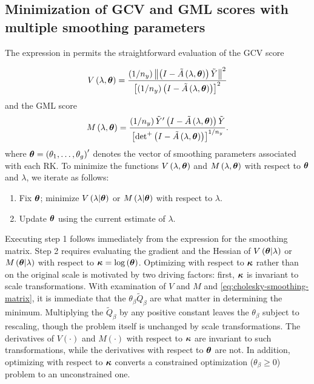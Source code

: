 \documentclass[12pt]{article}
\newcommand{\bftheta}{\mbox{\boldmath $\theta$}}
\newcommand{\bfkappa}{\mbox{\boldmath $\kappa$}}
\newcommand{\tildeY}{\tilde{Y}}
\newcommand{\tildeQ}{\tilde{Q}}
\newcommand{\tildeA}{\tilde{A}}
\theoremstyle{definition}
\begin{document}
\subsection{Minimization of GCV and GML scores with multiple smoothing parameters}

The expression in \label{ref:cholesky-smoothing-matrix} permits the straightforward evaluation of the GCV score

\begin{equation} \label{eq:general-GCV-score}
V\left(\lambda, \bftheta \right) = \frac{\left( 1/n_y \right)  \left \lVert \left(I - \tildeA\left(\lambda, \bftheta \right)\right) \tildeY \right\rVert^2}{\left[\left( 1/n_y \right) \left(I - \tildeA\left(\lambda, \bftheta \right)\right)  \right]^2}
\end{equation}
\noindent
and the GML score
\begin{equation} \label{eq:general-GML-score}
M\left(\lambda, \bftheta \right) = \frac{\left( 1/n_y \right) \tildeY' \left(I - \tildeA\left(\lambda, \bftheta \right)\right) \tildeY }{\left[ \mbox{det}^+\left(I - \tildeA\left(\lambda, \bftheta \right)\right)  \right]^{1/n_y}}.
\end{equation}
\noindent
where $\bftheta = \left(\theta_1,\dots, \theta_g\right)'$ denotes the vector of smoothing parameters associated with each RK.
\bigskip
To minimize the functions $V\left(\lambda, \bftheta\right)$ and $M\left(\lambda, \bftheta\right)$ with respect to $\bftheta$ and $\lambda$, we iterate as follows:

\begin{enumerate}
\item Fix $\bftheta$; minimize $V\left(\lambda \vert \bftheta\right)$ or $M\left(\lambda \vert \bftheta\right)$ with respect to $\lambda$.
\item Update $\bftheta$ using the current estimate of $\lambda$.
\end{enumerate}
\noindent
Executing step 1 follows immediately from the expression for the smoothing matrix. Step 2 requires evaluating the gradient and the Hessian of $V\left( \bftheta \vert \lambda \right)$ or $M\left(\bftheta \vert \lambda\right)$ with respect to $\bfkappa = \log\left(\bftheta\right)$. Optimizing with respect to $\bfkappa$ rather than on the original scale is motivated by two driving factors: first, $\bfkappa$ is invariant to scale transformations. With examination of $V$ and $M$ and \ref{eq:cholesky-smoothing-matrix}, it is immediate that the $\theta_\beta \tildeQ_\beta$ are what matter in determining the minimum. Multiplying the $\tildeQ_\beta$ by any positive constant leaves the $\theta_\beta$ subject to rescaling, though the problem itself is unchanged by scale transformations. The derivatives of $V\left(\cdot\right)$ and $M\left(\cdot\right)$ with respect to $\bfkappa$ are invariant to such transformations, while the derivatives with respect to $\bftheta$ are not. In addition, optimizing with respect to $\bfkappa$ converts a constrained optimization ($\theta_\beta \ge 0$) problem to an unconstrained one.




\end{document}

